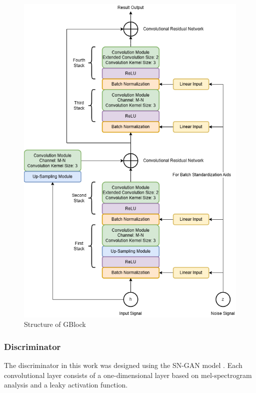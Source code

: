 \documentclass[10pt,journal,compsoc]{IEEEtran}
\begin{document}
\begin{figure}
    \centering
    \includegraphics[scale=0.44] {PNG/3-3.png}
    \caption{Structure of GBlock \cite{17}}
    \label{fig:3-3}
\end{figure}

\subsubsection{Discriminator}

The discriminator in this work was designed using the SN-GAN model \cite{18}. Each convolutional layer consists of a one-dimensional layer based on mel-spectrogram analysis and a leaky activation function.
\end{document}
